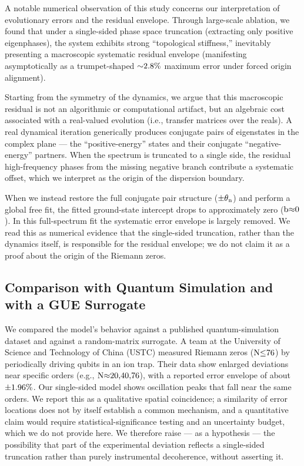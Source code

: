 \documentclass[fractalfract,article,submit,oneauthor,pdftex]{Definitions/mdpi}
\begin{document}
A notable numerical observation of this study concerns our
interpretation of evolutionary errors and the residual envelope.
Through large-scale ablation, we found that under
a single-sided phase space truncation (extracting only positive
eigenphases), the system exhibits strong ``topological stiffness,''
inevitably presenting a macroscopic systematic residual envelope
(manifesting asymptotically as a trumpet-shaped \(\text{\ensuremath{\sim}2.8\%}\)
maximum error under forced origin alignment).

Starting from the symmetry of the dynamics, we argue that
this macroscopic residual is not an algorithmic or computational
artifact, but an algebraic cost associated with a real-valued
evolution (i.e., transfer matrices over the reals). A real
dynamical iteration generically produces conjugate pairs of
eigenstates in the complex plane --- the ``positive-energy'' states and
their conjugate ``negative-energy'' partners. When the spectrum is
truncated to a single side, the residual high-frequency phases from the
missing negative branch contribute a systematic offset, which we
interpret as the origin of the dispersion boundary.

When we instead restore the full conjugate pair structure
(\(\text{\ensuremath{\pm}}\text{\ensuremath{\theta}}_{\text{n}}\)) and perform a global free fit, the
fitted ground-state intercept drops to approximately zero
(\(\text{b}\text{\ensuremath{\approx}0}\)). In this full-spectrum fit the systematic error
envelope is largely removed. We read this as numerical evidence that the
single-sided truncation, rather than the dynamics itself, is responsible
for the residual envelope; we do not claim it as a proof about the origin
of the Riemann zeros.

\subsection{Comparison with Quantum Simulation and with a GUE Surrogate}

We compared the model's behavior against a published quantum-simulation
dataset and against a random-matrix surrogate. A team at the University
of Science and Technology of China (USTC) measured Riemann zeros
(\(\text{N}\text{\ensuremath{\le}76}\)) by periodically driving qubits in an ion trap.
Their data show enlarged deviations near specific orders (e.g.,
\(\text{N}\text{\ensuremath{\approx}20,40,76}\)), with a reported error envelope of about
\(\text{\ensuremath{\pm}1.96\%}\). Our single-sided model shows oscillation peaks that
fall near the same orders. We report this as a qualitative spatial
coincidence; a similarity of error locations does not by itself
establish a common mechanism, and a quantitative claim would require
statistical-significance testing and an uncertainty budget, which we do
not provide here. We therefore raise --- as a hypothesis --- the
possibility that part of the experimental deviation reflects a
single-sided truncation rather than purely instrumental decoherence,
without asserting it.
\end{document}
